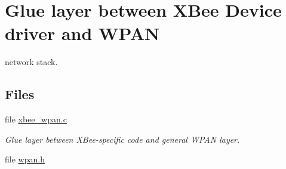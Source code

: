 \hypertarget{group__xbee__wpan}{\section{Glue layer between X\-Bee Device driver and W\-P\-A\-N}
\label{group__xbee__wpan}
}


network stack.  


\subsection*{Files}
\begin{DoxyCompactItemize}
\item 
file \hyperlink{xbee__wpan_8c}{xbee\-\_\-wpan.\-c}
\begin{DoxyCompactList}\small\item\em Glue layer between X\-Bee-\/specific code and general W\-P\-A\-N layer. \end{DoxyCompactList}\item 
file \hyperlink{wpan_8h}{wpan.\-h}
\end{DoxyCompactItemize}
